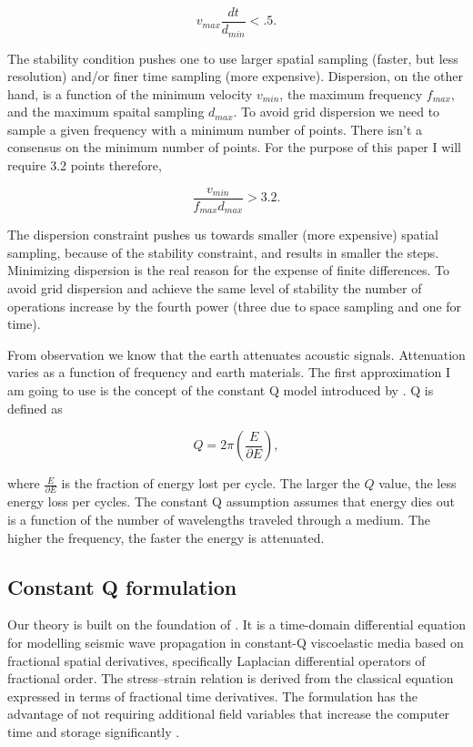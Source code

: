 \documentclass{paris17}
\begin{document}
\begin{equation}
v_{max}\frac{dt}{d_{min}} < .5 \label{eq:stability}.
\end{equation}

The stability condition pushes one to use larger spatial sampling (faster, but less resolution) and/or finer time sampling (more expensive).  Dispersion, on the other hand, is a function of the minimum velocity $v_{min}$, the maximum frequency $f_{max}$, and the maximum spaital sampling $d_{max}$.   To avoid grid dispersion we need to  sample a given frequency with a minimum number of points.  There isn't a consensus on the minimum number
of points. For the purpose of this paper I will require  3.2  points therefore,

\begin{equation}
\frac{v_{min} }{f_{max}d_{max}} > 3.2 \label{eq:dispersion}.
\end{equation}

The dispersion constraint pushes us towards smaller (more expensive) spatial sampling, because of the stability constraint, and results in smaller the steps.  Minimizing dispersion is the real reason for the expense of finite differences.  To avoid grid dispersion and achieve the same level of stability the number of operations increase by the fourth power (three due to space sampling and one for time).

From observation we know that the earth attenuates acoustic signals.  Attenuation varies as a function of frequency and earth materials. The first approximation I am going to use is the concept of the constant Q model introduced by \cite{Kjartansson.sep.23}.  Q is defined as

\begin{equation}
Q=2 \pi \left( \frac{E}{\partial E}\right),
\end{equation}

where $\frac{E}{\partial E}$ is the fraction of energy lost per cycle. The larger the $Q$ value, the less energy loss per cycles.  The constant Q assumption assumes that energy dies out is a function of the number of wavelengths traveled through a medium. The higher the frequency, the faster the energy is attenuated.

\subsection{Constant Q formulation}

Our theory is built on the foundation of \cite[]{zhu2014theory}. It is a time-domain differential equation for modelling seismic wave propagation in constant-Q viscoelastic media based on fractional spatial derivatives, specifically Laplacian differential operators of fractional order.  The stress–strain relation is derived from the classical equation expressed in terms of fractional time derivatives. The formulation has the advantage of not requiring additional field variables that increase the computer time and storage significantly \cite[]{zhu2014theory}.
\end{document}
